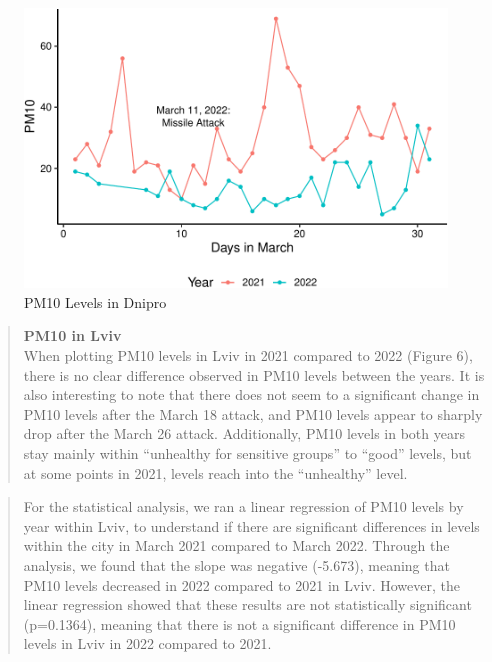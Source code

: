 \documentclass[
  12pt,
]{article}
\begin{document}
\begin{figure}
\centering
\includegraphics{Fontanie_Gordon_Weinberg_Project_files/figure-latex/visualizing PM10 in Dnipro-1.pdf}
\caption{PM10 Levels in Dnipro}
\end{figure}

\newpage

\begin{quote}
\textbf{PM10 in Lviv}\\
When plotting PM10 levels in Lviv in 2021 compared to 2022 (Figure 6),
there is no clear difference observed in PM10 levels between the years.
It is also interesting to note that there does not seem to a significant
change in PM10 levels after the March 18 attack, and PM10 levels appear
to sharply drop after the March 26 attack. Additionally, PM10 levels in
both years stay mainly within ``unhealthy for sensitive groups'' to
``good'' levels, but at some points in 2021, levels reach into the
``unhealthy'' level.
\end{quote}

\begin{quote}
For the statistical analysis, we ran a linear regression of PM10 levels
by year within Lviv, to understand if there are significant differences
in levels within the city in March 2021 compared to March 2022. Through
the analysis, we found that the slope was negative (-5.673), meaning
that PM10 levels decreased in 2022 compared to 2021 in Lviv. However,
the linear regression showed that these results are not statistically
significant (p=0.1364), meaning that there is not a significant
difference in PM10 levels in Lviv in 2022 compared to 2021.
\end{quote}
\end{document}
